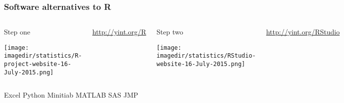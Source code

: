 \begin{frame}\frametitle{Software alternatives to R}
	\begin{columns}[b]
			
			\begin{exampleblock}{\color{red}Step one}
				
				\vspace{10pt}
				\centerline{\texttt{[image: \\imagedir/statistics/R-project-website-16-July-2015.png]}}
			\end{exampleblock}
			
			\vfill
			
			\href{http://yint.org/R}{http://yint.org/R}
		
		
			\begin{exampleblock}{\color{red}Step two}
				\centerline{\texttt{[image: \\imagedir/statistics/RStudio-website-16-July-2015.png]}}
			\end{exampleblock}
			
			\vfill
			\href{http://yint.org/RStudio}{http://yint.org/RStudio}
	\end{columns}
	Excel
	Python
	Minitiab
	MATLAB
	SAS
	JMP
	
\end{frame}


{
\begin{frame}\frametitle{}
\end{frame}}

{
\begin{frame}\frametitle{}
\end{frame}}

